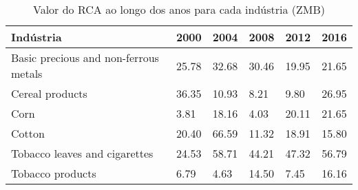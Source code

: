 \begin{table}
\centering
\caption{Valor do RCA ao longo dos anos para cada indústria (ZMB)}
\label{tab:ex3-tempo-ZMB}
\begin{tabular}{p{6cm}p{1.5cm}p{1.5cm}p{1.5cm}p{1.5cm}p{1.5cm}}
\toprule
                            Indústria &  2000 &  2004 &  2008 &  2012 &  2016 \\
\midrule
Basic precious and non-ferrous metals & 25.78 & 32.68 & 30.46 & 19.95 & 21.65 \\
                      Cereal products & 36.35 & 10.93 &  8.21 &  9.80 & 26.95 \\
                                 Corn &  3.81 & 18.16 &  4.03 & 20.11 & 21.65 \\
                               Cotton & 20.40 & 66.59 & 11.32 & 18.91 & 15.80 \\
        Tobacco leaves and cigarettes & 24.53 & 58.71 & 44.21 & 47.32 & 56.79 \\
                     Tobacco products &  6.79 &  4.63 & 14.50 &  7.45 & 16.16 \\
\bottomrule
\end{tabular}
\end{table}
